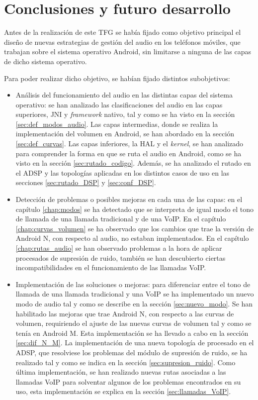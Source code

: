 \chapter{Conclusiones y futuro desarrollo}
Antes de la realización de este \gls{TFG} se había fijado como objetivo principal el diseño de nuevas estrategias de gestión del audio en los teléfonos móviles, que trabajan sobre el sistema operativo Android, sin limitarse a ninguna de las capas de dicho sistema operativo.

Para poder realizar dicho objetivo, se habían fijado distintos subobjetivos:
\begin{itemize}
	\item{Análisis del funcionamiento del audio en las distintas capas del sistema operativo: se han analizado las clasificaciones del audio en las capas superiores, \gls{JNI} y \textit{framework} nativo, tal y como se ha visto en la sección \ref{sec:def_modos_audio}. Las capas intermedias, donde se realiza la implementación del volumen en Android, se han abordado en la sección \ref{sec:def_curvas}. Las capas inferiores, la \gls{HAL} y el \textit{kernel}, se han analizado para comprender la forma en que se ruta el audio en Android, como se ha visto en la sección \ref{sec:rutado_codigo}. Además, se ha analizado el rutado en el \gls{ADSP} y las topologías aplicadas en los distintos casos de uso en las secciones \ref{sec:rutado_DSP} y \ref{sec:conf_DSP}.}
	\item{Detección de problemas o posibles mejoras en cada una de las capas: en el capítulo \ref{chap:modos} se ha detectado que se interpreta de igual modo el tono de llamada de una llamada tradicional y de una \gls{VoIP}. En el capítulo \ref{chap:curvas_volumen} se ha observado que los cambios que trae la versión de Android N, con respecto al audio, no estaban implementados. En el capítulo \ref{chap:rutas_audio} se han observado problemas a la hora de aplicar procesados de supresión de ruido, también se han descubierto ciertas incompatibilidades en el funcionamiento de las llamadas \gls{VoIP}.}
	\item{Implementación de las soluciones o mejoras: para diferenciar entre el tono de llamada de una llamada tradicional y una \gls{VoIP} se ha implementado un nuevo modo de audio tal y como se describe en la sección \ref{sec:nuevo_modo}. Se han habilitado las mejoras que trae Android N, con respecto a las curvas de volumen, requiriendo el ajuste de las nuevas curvas de volumen tal y como se tenía en Android M. Esta implementación se ha llevado a cabo en la sección \ref{sec:dif_N_M}. La implementación de una nueva topología de procesado en el \gls{ADSP}, que resolviese los problemas del módulo de supresión de ruido, se ha realizado tal y como se indica en la sección \ref{sec:supresion_ruido}. Como última implementación, se han realizado nuevas rutas asociadas a las llamadas \gls{VoIP} para solventar algunos de los problemas encontrados en su uso, esta implementación se explica en la sección \ref{sec:llamadas_VoIP}.}

\end{itemize}
